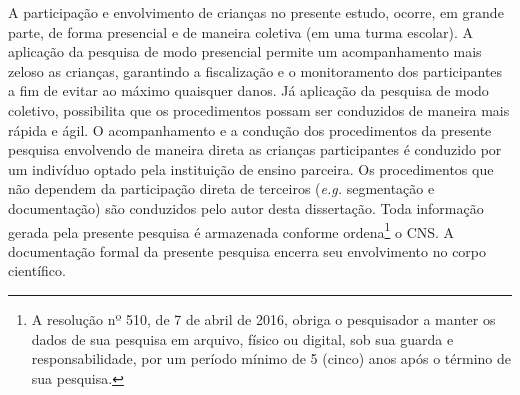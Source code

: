 A participação e envolvimento de crianças no presente estudo, ocorre, em grande parte, de forma presencial e de maneira coletiva (em uma turma escolar). A aplicação da pesquisa de modo presencial permite um acompanhamento mais zeloso as crianças, garantindo a fiscalização e o monitoramento dos participantes a fim de evitar ao máximo quaisquer danos. Já aplicação da pesquisa de modo coletivo, possibilita que os procedimentos possam ser conduzidos de maneira mais rápida e ágil. O acompanhamento e a condução dos procedimentos da presente pesquisa envolvendo de maneira direta as crianças participantes é conduzido por um indivíduo optado pela instituição de ensino parceira. Os procedimentos que não dependem da participação direta de terceiros (\textit{e.g.} segmentação e documentação) são conduzidos pelo autor desta dissertação. Toda informação gerada pela presente pesquisa é armazenada conforme ordena\footnote{A resolução nº 510, de 7 de abril de 2016, obriga o pesquisador a manter os dados de sua pesquisa em arquivo, físico ou digital, sob sua guarda e responsabilidade, por um período mínimo de 5 (cinco) anos após o término de sua pesquisa.} o \ac{CNS}. A documentação formal da presente pesquisa encerra seu envolvimento no corpo científico.






